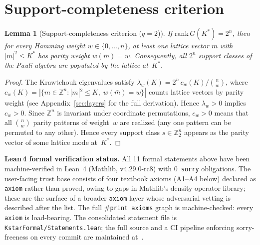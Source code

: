 \documentclass[twocolumn,prx,aps,superscriptaddress,longbibliography,floatfix]{revtex4-2}
\newtheorem{lemma}[theorem]{Lemma}
\newcommand{\pclaim}[4]{}
\begin{document}

\section{Support-completeness criterion}

\pclaim{env:lem:completeness}{proved}{q=2}{lem:completeness}%
\begin{lemma}[Support-completeness criterion ($q = 2$)]
\label{lem:completeness}
If\/ $\mathrm{rank}\,G(K^*) = 2^n$, then for every Hamming weight
$w \in \{0,\ldots,n\}$, at least one lattice vector $m$ with
$|m|^2 \le K^*$ has parity weight $w(\bar{m}) = w$.
Consequently, all $2^n$ support classes of the Pauli algebra are
populated by the lattice at~$K^*$.
\end{lemma}

\begin{proof}
The Krawtchouk eigenvalues satisfy
$\lambda_w(K) = 2^n \, c_w(K) / \binom{n}{w}$, where
$c_w(K) = |\{m \in \mathbb{Z}^n : |m|^2 \le K,\; w(\bar{m}) = w\}|$
counts lattice vectors by parity weight
(see Appendix~\ref{sec:layers} for the full derivation).
Hence $\lambda_w > 0$ implies $c_w > 0$.
Since $\mathbb{Z}^n$ is invariant under coordinate permutations,
$c_w > 0$ means that all $\binom{n}{w}$ parity patterns of weight~$w$
are realized (any one pattern can be permuted to any other).
Hence every support class $s \in \mathbb{Z}_2^n$ appears as the parity
vector of some lattice mode at~$K^*$.
\end{proof}


\bigskip
\noindent\textbf{Lean\,4 formal verification status.}
All 11 formal statements above have been machine-verified in Lean~4
(Mathlib, v4.29.0-rc8) with 0~\texttt{sorry} obligations.
The user-facing trust base consists of four textbook axioms
(A1--A4 below) declared as \texttt{axiom} rather than proved,
owing to gaps in Mathlib's density-operator library; these are
the surface of a broader \texttt{axiom} layer whose
adversarial vetting is described after the list.
The full $\#$\texttt{print axioms} graph is machine-checked:
every \texttt{axiom} is load-bearing.
The consolidated statement file is
\texttt{KstarFormal/Statements.lean};
the full source and a CI pipeline enforcing sorry-freeness
on every commit are maintained
at~\cite{github_verification}.
\end{document}
